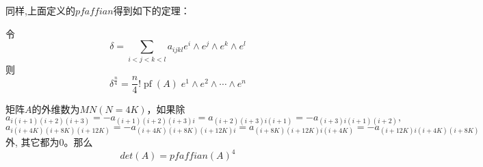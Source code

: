 \documentclass[twoside,a4paper,CCT]{cctart}   %
\begin{document}
同样,上面定义的$pfaffian$得到如下的定理：
\begin{theorem}
令
\begin{equation}\delta=\sum_{i<j<k<l}a_{ijkl}e^{i} \wedge e^{j} \wedge e^{k} \wedge e^{l}\end{equation}
则
\begin{equation}\delta^{\frac{n}{4}} = \frac{n}{4}! \operatorname{pf}(A)\;e^1\wedge e^2\wedge\cdots\wedge e^{n}\end{equation}
\end{theorem}
\begin{theorem}
矩阵$A$的外维数为$MN(N=4K)$，如果除$$a_{i(i+1)(i+2)(i+3)}=-a_{(i+1)(i+2)(i+3)i}=a_{(i+2)(i+3)i(i+1)}=-a_{(i+3)i(i+1)(i+2)},$$$$a_{i(i+4K)(i+8K)(i+12K)}=-a_{(i+4K)(i+8K)(i+12K)i}=a_{(i+8K)(i+12K)i(i+4K)}=-a_{(i+12K)i(i+4K)(i+8K)}$$ 外, 其它都为0。那么$$det(A)=pfaffian(A)^{4}$$
\end{theorem}
\end{document}
